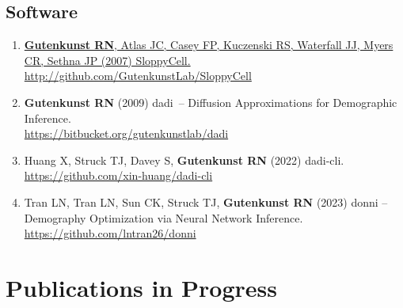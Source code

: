 \documentclass[11pt]{article}
\newcommand{\dadi}{dadi\xspace}
\begin{document}
\subsection*{Software}
\begin{enumerate}

\item \href{http://github.com/GutenkunstLab/SloppyCell}{\grad \textbf{Gutenkunst RN}, Atlas JC, Casey FP, Kuczenski RS, Waterfall JJ, Myers CR, Sethna JP (2007) 
SloppyCell.} \url{http://github.com/GutenkunstLab/SloppyCell}

\item\textbf{Gutenkunst RN} (2009)
\dadi\ -- Diffusion Approximations for Demographic Inference. \\ \url{https://bitbucket.org/gutenkunstlab/dadi}

\item Huang X\trainee, Struck TJ\trainee, Davey S, \textbf{Gutenkunst RN} (2022) dadi-cli.\\ \url{https://github.com/xin-huang/dadi-cli}

\item Tran LN\trainee, Tran LN\trainee, Sun CK\trainee, Struck TJ\trainee, \textbf{Gutenkunst RN} (2023) donni -- Demography Optimization via Neural Network Inference. \url{https://github.com/lntran26/donni}

\end{enumerate}


\section*{Publications in Progress}
\end{document}

